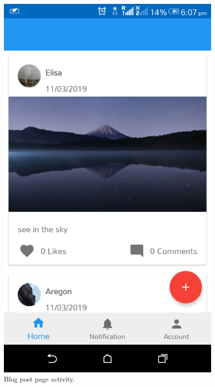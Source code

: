 \noindent
\begin{figure}[!ht]
	\centering
	\includegraphics[scale=0.2]{blog-post.png}
	\caption{\label{img17} Blog post page activity.}
\end{figure}

